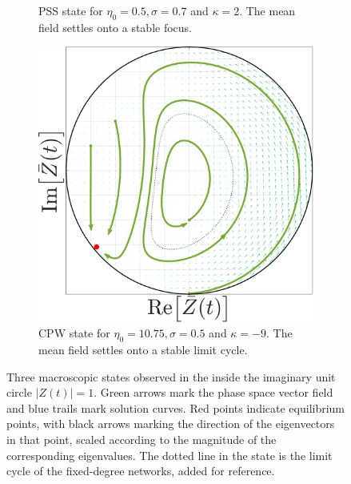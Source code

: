 \begin{figure}[H]
\begin{subfigure}[b]{0.32\linewidth}
   \caption{PSS state for $\eta_0 = 0.5, \sigma = 0.7$ and $\kappa= 2$. The mean field settles onto a stable focus.}
   \label{fig:MFOARPSS_random}
\end{subfigure} \hfill
\begin{subfigure}[b]{0.32\linewidth}
   \centering
  \includegraphics[width=\linewidth]{../Figures/PhaseSpace/MFOARCPW_random.pdf}
   \caption{CPW state for $\eta_0 = 10.75, \sigma = 0.5$ and $\kappa= -9$. The mean field settles onto a stable limit cycle.}
   \label{fig:MFOARCPW_random}
\end{subfigure}
   \caption{Three macroscopic states observed in the \MFR inside the imaginary unit circle $|Z(t)| = 1$. Green arrows mark the phase space vector field and blue trails mark solution curves. Red points indicate equilibrium points, with black arrows marking the direction of the eigenvectors in that point, scaled according to the magnitude of the corresponding eigenvalues. The dotted line in the \CPW state is the limit cycle of the fixed-degree networks, added for reference.}
   \label{fig:macroscopicstatesrandomnetworks}
\end{figure}

